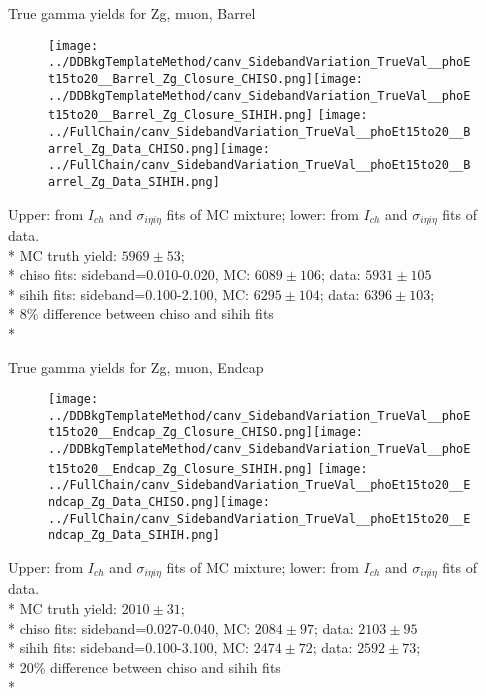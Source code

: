 \documentclass{beamer}
\begin{document}
\begin{frame}{True gamma yields for Zg, muon, Barrel}
  \begin{figure}
    \centering
    \texttt{[image: ../DDBkgTemplateMethod/canv\_SidebandVariation\_TrueVal\_\_phoEt15to20\_\_Barrel\_Zg\_Closure\_CHISO.png]}\texttt{[image: ../DDBkgTemplateMethod/canv\_SidebandVariation\_TrueVal\_\_phoEt15to20\_\_Barrel\_Zg\_Closure\_SIHIH.png]}
    \texttt{[image: ../FullChain/canv\_SidebandVariation\_TrueVal\_\_phoEt15to20\_\_Barrel\_Zg\_Data\_CHISO.png]}\texttt{[image: ../FullChain/canv\_SidebandVariation\_TrueVal\_\_phoEt15to20\_\_Barrel\_Zg\_Data\_SIHIH.png]}
  \end{figure}
  \scriptsize Upper: from $I_{ch}$ and $\sigma_{i{\eta}i{\eta}}$ fits of MC mixture; lower: from $I_{ch}$ and $\sigma_{i{\eta}i{\eta}}$ fits of data.\\*
  \scriptsize MC truth yield: $5969{\pm}53$; \\*
  \scriptsize chiso fits: sideband=0.010-0.020, MC:  $6089{\pm}106$; data: $5931{\pm}105$\\*
  \scriptsize sihih fits: sideband=0.100-2.100, MC:  $6295{\pm}104$; data: $6396{\pm}103$;\\*
  \scriptsize 8\% difference between chiso and sihih fits \\*
\end{frame}

\begin{frame}{True gamma yields for Zg, muon, Endcap}
  \begin{figure}
    \centering
    \texttt{[image: ../DDBkgTemplateMethod/canv\_SidebandVariation\_TrueVal\_\_phoEt15to20\_\_Endcap\_Zg\_Closure\_CHISO.png]}\texttt{[image: ../DDBkgTemplateMethod/canv\_SidebandVariation\_TrueVal\_\_phoEt15to20\_\_Endcap\_Zg\_Closure\_SIHIH.png]}
    \texttt{[image: ../FullChain/canv\_SidebandVariation\_TrueVal\_\_phoEt15to20\_\_Endcap\_Zg\_Data\_CHISO.png]}\texttt{[image: ../FullChain/canv\_SidebandVariation\_TrueVal\_\_phoEt15to20\_\_Endcap\_Zg\_Data\_SIHIH.png]}
  \end{figure}
  \scriptsize Upper: from $I_{ch}$ and $\sigma_{i{\eta}i{\eta}}$ fits of MC mixture; lower: from $I_{ch}$ and $\sigma_{i{\eta}i{\eta}}$ fits of data.\\*
  \scriptsize MC truth yield: $2010{\pm}31$;\\*
  \scriptsize chiso fits: sideband=0.027-0.040, MC:  $2084{\pm}97$; data: $2103{\pm}95$\\*
  \scriptsize sihih fits: sideband=0.100-3.100, MC:  $2474{\pm}72$; data: $2592{\pm}73$;\\*
  \scriptsize 20\% difference between chiso and sihih fits \\*
\end{frame}
\end{document}
